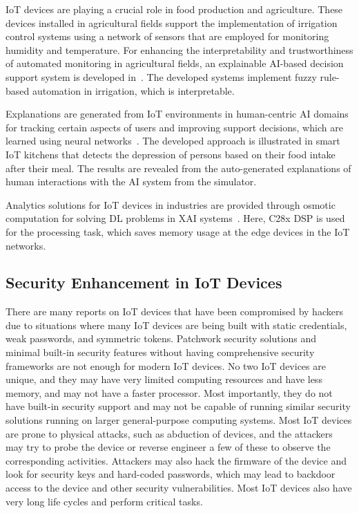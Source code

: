 \documentclass[journal]{IEEEtran}
\begin{document}
IoT devices are playing a crucial role in food production and agriculture. These devices installed in agricultural fields support the implementation of irrigation control systems using a network of sensors that are employed for monitoring humidity and temperature. For enhancing the interpretability and trustworthiness of automated monitoring in agricultural fields, an explainable AI-based decision support system is developed in~\cite{tsakiridis2020versatile}. The developed systems implement fuzzy rule-based automation in irrigation, which is interpretable.

Explanations are generated from IoT environments in human-centric AI domains for tracking certain aspects of users and improving support decisions, which are learned using neural networks~\cite{garcia2019human}. The developed approach is illustrated in smart IoT kitchens that detects the depression of persons based on their food intake after their meal. The results are revealed from the auto-generated explanations of human interactions with the AI system from the simulator. 

Analytics solutions for IoT devices in industries are provided through osmotic computation for solving DL problems in XAI systems~\cite{oyekanlu2018distributed}. Here, C28x DSP is used for the processing task, which saves memory usage at the edge devices in the IoT networks. 

\subsection{Security Enhancement in IoT Devices}

There are many reports on IoT devices that have been compromised by hackers due to situations where many IoT devices are being built with static credentials, weak passwords, and symmetric tokens. Patchwork security solutions and minimal built-in security features without having comprehensive security frameworks are not enough for modern IoT devices. No two IoT devices are unique, and they may have very limited computing resources and have less memory, and may not have a faster processor. Most importantly, they do not have built-in security support and may not be capable of running similar security solutions running on larger general-purpose computing systems. Most IoT devices are prone to physical attacks, such as abduction of devices, and the attackers may try to probe the device or reverse engineer a few of these to observe the corresponding activities. Attackers may also hack the firmware of the device and look for security keys and hard-coded passwords, which may lead to backdoor access to the device and other security vulnerabilities. Most IoT devices also have very long life cycles and perform critical tasks. 
\end{document}
